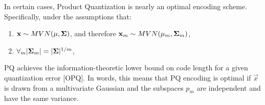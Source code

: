 

In certain cases, Product Quantization is nearly an optimal encoding scheme. Specifically, under the assumptions that:
\begin{enumerate}
\item $\mathbf{x} \sim MVN(\mathbf{\mu}, \mathbf{\Sigma})$, and therefore $\mathbf{x}_m \sim MVN(\mathbf{\mu}_m, \mathbf{\Sigma}_m)$,
\item $\forall_m |\mathbf{\Sigma}_m| = |\mathbf{\Sigma}|^{1/m}$,
\end{enumerate}
PQ achieves the information-theoretic lower bound on code length for a given quantization error [OPQ]. In words, this means that PQ encoding is optimal if $\vec{x}$ is drawn from a multivariate Gaussian and the subspaces $p_m$ are independent and have the same variance.

